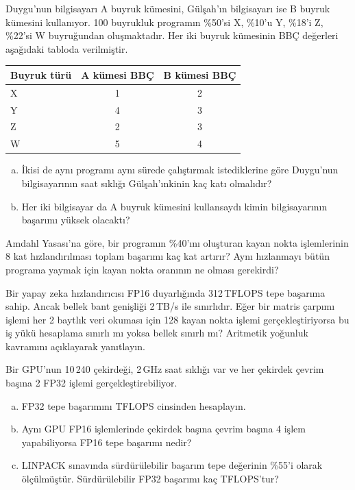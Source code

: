 \begin{alistirma}[\orta]
Duygu'nun bilgisayarı A buyruk kümesini, Gülşah'ın bilgisayarı ise B buyruk kümesini kullanıyor. 100 buyrukluk programın \%50'si X, \%10'u Y, \%18'i Z, \%22'si W buyruğundan oluşmaktadır. Her iki buyruk kümesinin BBÇ değerleri aşağıdaki tabloda verilmiştir.

\begin{center}
\small
\begin{tabular}{lcc}
\toprule
\textbf{Buyruk türü} & \textbf{A kümesi BBÇ} & \textbf{B kümesi BBÇ} \\
\midrule
X & 1 & 2 \\
Y & 4 & 3 \\
Z & 2 & 3 \\
W & 5 & 4 \\
\bottomrule
\end{tabular}
\end{center}

\begin{enumerate}[(a)]
    \item İkisi de aynı programı aynı sürede çalıştırmak istediklerine göre Duygu'nun bilgisayarının saat sıklığı Gülşah'ınkinin kaç katı olmalıdır?
    \item Her iki bilgisayar da A buyruk kümesini kullansaydı kimin bilgisayarının başarımı yüksek olacaktı?
\end{enumerate}
\end{alistirma}

\begin{alistirma}[\orta]
Amdahl Yasası'na göre, bir programın \%40'ını oluşturan kayan nokta işlemlerinin 8 kat hızlandırılması toplam başarımı kaç kat artırır? Aynı hızlanmayı bütün programa yaymak için kayan nokta oranının ne olması gerekirdi?
\end{alistirma}

\begin{alistirma}[\orta]
Bir yapay zeka hızlandırıcısı FP16 duyarlığında 312\,TFLOPS tepe başarıma sahip. Ancak bellek bant genişliği 2\,TB/s ile sınırlıdır. Eğer bir matris çarpımı işlemi her 2 baytlık veri okuması için 128 kayan nokta işlemi gerçekleştiriyorsa bu iş yükü hesaplama sınırlı mı yoksa bellek sınırlı mı? Aritmetik yoğunluk kavramını açıklayarak yanıtlayın.
\end{alistirma}

\begin{alistirma}[\orta]
Bir GPU'nun 10\,240 çekirdeği, 2\,GHz saat sıklığı var ve her çekirdek çevrim başına 2 FP32 işlemi gerçekleştirebiliyor.
\begin{enumerate}[(a)]
    \item FP32 tepe başarımını TFLOPS cinsinden hesaplayın.
    \item Aynı GPU FP16 işlemlerinde çekirdek başına çevrim başına 4 işlem yapabiliyorsa FP16 tepe başarımı nedir?
    \item LINPACK sınavında sürdürülebilir başarım tepe değerinin \%55'i olarak ölçülmüştür. Sürdürülebilir FP32 başarımı kaç TFLOPS'tur?
\end{enumerate}
\end{alistirma}

